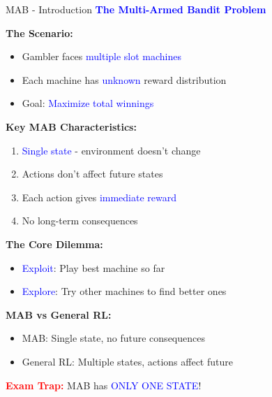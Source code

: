 \documentclass[8pt]{beamer}
\begin{document}
	
	\begin{frame}{MAB - Introduction}
		\fontsize{6.5}{7.5}\selectfont
		\textcolor{blue}{\textbf{The Multi-Armed Bandit Problem}}
		
		\textbf{The Scenario:}
		\begin{itemize}
			\item Gambler faces \textcolor{blue}{multiple slot machines}
			\item Each machine has \textcolor{blue}{unknown} reward distribution
			\item Goal: \textcolor{blue}{Maximize total winnings}
		\end{itemize}
		
		\textbf{Key MAB Characteristics:}
		\begin{enumerate}
			\item \textcolor{blue}{Single state} - environment doesn't change
			\item Actions don't affect future states
			\item Each action gives \textcolor{blue}{immediate reward}
			\item No long-term consequences
		\end{enumerate}
		
		\textbf{The Core Dilemma:}
		\begin{itemize}
			\item \textcolor{blue}{Exploit}: Play best machine so far
			\item \textcolor{blue}{Explore}: Try other machines to find better ones
		\end{itemize}
		
		\textbf{MAB vs General RL:}
		\begin{itemize}
			\item MAB: Single state, no future consequences
			\item General RL: Multiple states, actions affect future
		\end{itemize}
		
		\textcolor{red}{\textbf{Exam Trap:}} MAB has \textcolor{blue}{ONLY ONE STATE}!
	\end{frame}
	
\end{document}
